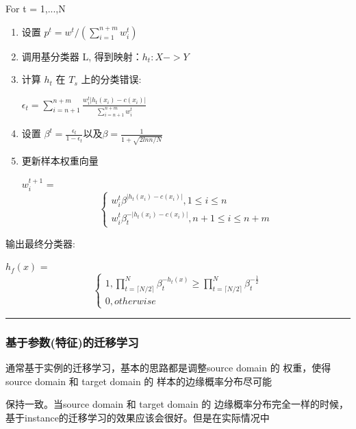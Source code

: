 For t = 1,...,N
\begin{enumerate}
\item 设置 {$p^t = w^t/(\sum_{i=1}^{n+m} w_i^t)$}

\item 调用基分类器 L, 得到映射：{$h_t : X->Y$}

\item 计算 $h_t$ 在 $T_s$ 上的分类错误:  \newline

$\epsilon_t = \sum_{i=n+1}^{n+m} \frac{w_i^t |h_t(x_i) - c(x_i)|}{\sum_{i=n+1}^{n+m} w_i^t}$

\item 设置 ${\beta^t = \frac{\epsilon_t}{1 - \epsilon_t}} \text{以及} {\beta = \frac{1}{1+\sqrt{2lnn/N}}}$

\item 更新样本权重向量

{

$w_i^{t+1}$ = 
\begin{equation}
\begin{cases}
w_i^t\beta^{|h_t(x_i) - c(x_i)|}, 1 \leq i \leq n\\
w_i^t\beta_t^{-|h_t(x_i) - c(x_i)|}, n+1 \leq i \leq n+m
\end{cases}
\end{equation}

}
\end{enumerate}

输出最终分类器:

{

$h_f(x)$ = 
\begin{equation}
\begin{cases}
1, \prod_{t=\lceil N/2\rceil}^{N} {\beta}_t^{-h_t(x)} \geq \prod_{t=\lceil N/2\rceil}^{N} {\beta}_t^{-\frac{1}{2}} \\
0, otherwise
\end{cases}
\end{equation}

}

\noindent\rule[0.25\baselineskip]{\textwidth}{1pt}



\subsubsection{基于参数(特征)的迁移学习}
通常基于实例的迁移学习，基本的思路都是调整source domain 的 权重，使得source domain 和 target domain 的 样本的边缘概率分布尽可能

保持一致。当source domain 和 target domain 的 边缘概率分布完全一样的时候，基于instance的迁移学习的效果应该会很好。但是在实际情况中

